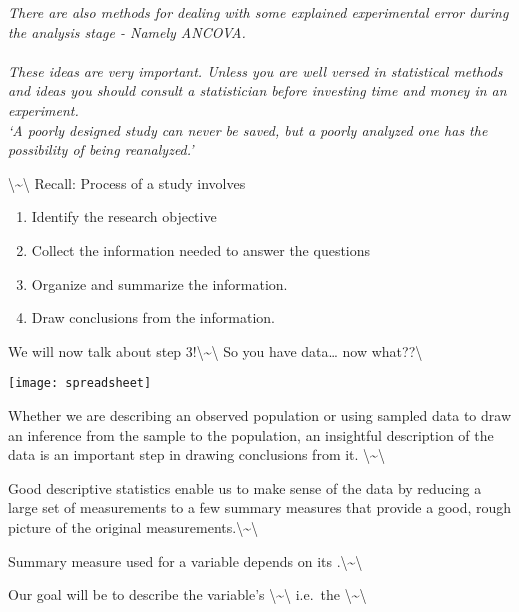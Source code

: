 \documentclass[]{book}
\begin{document}
\noindent\textit{There are also methods for dealing with some explained experimental error during the analysis stage - Namely ANCOVA.\\~\\
        These ideas are very important.  Unless you are well versed in statistical methods and ideas you should consult a statistician before investing time and money in an experiment.\\
`A poorly designed study can never be saved, but a poorly analyzed one has the possibility of being reanalyzed.'}

\normalsize \textbackslash{}\textasciitilde{}\textbackslash{} Recall:
Process of a study involves

\begin{enumerate}
\item Identify the research objective
\item Collect the information needed to answer the questions
\item Organize and summarize the information.
\item Draw conclusions from the information.
\end{enumerate}

We will now talk about step
3!\textbackslash{}\textasciitilde{}\textbackslash{} So you have
data\ldots{} now what??\textbackslash{}

\begin{center}
\texttt{[image: spreadsheet]}
\end{center}

Whether we are describing an observed population or using sampled data
to draw an inference from the sample to the population, an insightful
description of the data is an important step in drawing conclusions from
it. \textbackslash{}\textasciitilde{}\textbackslash{}

Good descriptive statistics enable us to make sense of the data by
reducing a large set of measurements to a few summary measures that
provide a good, rough picture of the original
measurements.\textbackslash{}\textasciitilde{}\textbackslash{}

Summary measure used for a variable depends on its
\underbar{~~~~~~~~~~~~~~~~~~~~~~~~~~~~~~~~~~~~}.\textbackslash{}\textasciitilde{}\textbackslash{}

Our goal will be to describe the variable's
\underbar{~~~~~~~~~~~~~~~~~~~~~~~~~~~~~~~~~~~~}\textbackslash{}\textasciitilde{}\textbackslash{}
i.e.~the \textbackslash{}\textasciitilde{}\textbackslash{}
\end{document}
